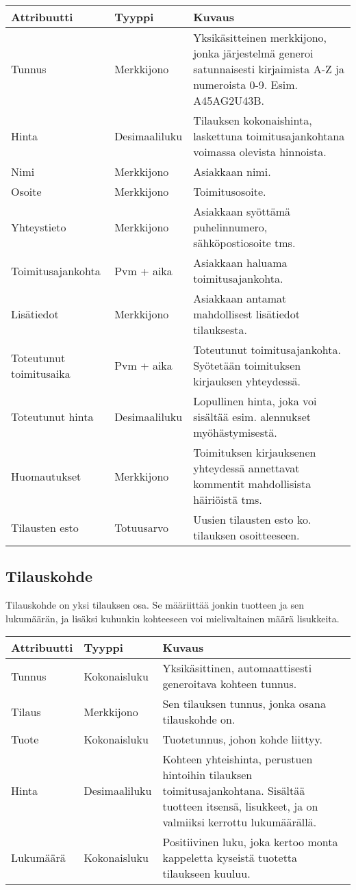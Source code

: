 \documentclass[a4paper, 12pt, finnish]{article}
\begin{document}
\vspace{0.5cm}\hspace{-1cm}
\begin{tabular}{l l p{7cm}}
\textbf{Attribuutti} & \textbf{Tyyppi} & \textbf{Kuvaus} \\
\hline
Tunnus & Merkkijono & Yksikäsitteinen merkkijono, jonka järjestelmä generoi satunnaisesti kirjaimista A-Z ja numeroista 0-9. Esim. A45AG2U43B.  \\ 
Hinta & Desimaaliluku & Tilauksen kokonaishinta, laskettuna toimitusajankohtana voimassa olevista hinnoista. \\
Nimi & Merkkijono & Asiakkaan nimi. \\
Osoite & Merkkijono & Toimitusosoite. \\
Yhteystieto & Merkkijono & Asiakkaan syöttämä puhelinnumero, sähköpostiosoite tms. \\
Toimitusajankohta & Pvm + aika & Asiakkaan haluama toimitusajankohta. \\
Lisätiedot & Merkkijono & Asiakkaan antamat mahdollisest lisätiedot tilauksesta. \\
Toteutunut toimitusaika & Pvm + aika & Toteutunut toimitusajankohta. Syötetään toimituksen kirjauksen yhteydessä. \\
Toteutunut hinta & Desimaaliluku & Lopullinen hinta, joka voi sisältää esim. alennukset myöhästymisestä. \\
Huomautukset & Merkkijono & Toimituksen kirjauksenen yhteydessä annettavat kommentit mahdollisista häiriöistä tms. \\
Tilausten esto & Totuusarvo & Uusien tilausten esto ko. tilauksen osoitteeseen. \\
\end{tabular}

\subsection*{Tilauskohde}
Tilauskohde on yksi tilauksen osa. Se määriittää jonkin tuotteen ja sen lukumäärän, ja lisäksi kuhunkin kohteeseen voi mielivaltainen määrä lisukkeita.

\vspace{0.5cm}\hspace{-1cm}
\begin{tabular}{l l p{7cm}}
\textbf{Attribuutti} & \textbf{Tyyppi} & \textbf{Kuvaus} \\
\hline
Tunnus & Kokonaisluku & Yksikäsittinen, automaattisesti generoitava kohteen tunnus. \\
Tilaus & Merkkijono & Sen tilauksen tunnus, jonka osana tilauskohde on. \\
Tuote & Kokonaisluku & Tuotetunnus, johon kohde liittyy. \\
Hinta & Desimaaliluku & Kohteen yhteishinta, perustuen hintoihin tilauksen toimitusajankohtana. Sisältää tuotteen itsensä, lisukkeet, ja on valmiiksi kerrottu lukumäärällä. \\
Lukumäärä & Kokonaisluku & Positiivinen luku, joka kertoo monta kappeletta kyseistä tuotetta tilaukseen kuuluu. \\
\end{tabular}
\end{document}
